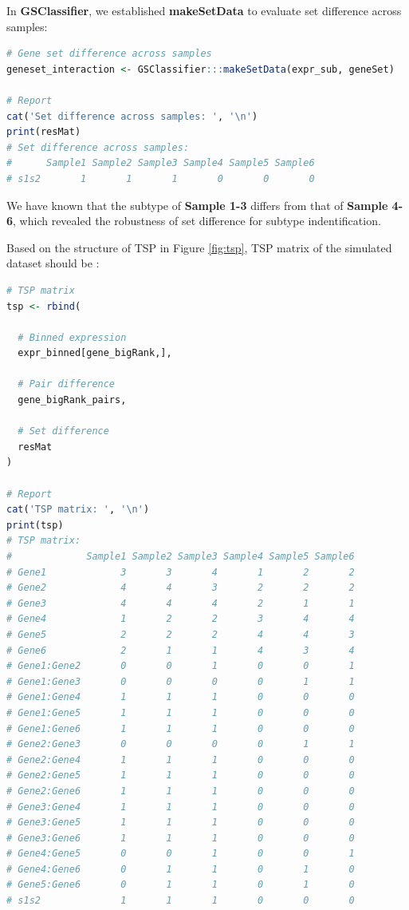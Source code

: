 \documentclass[
  12pt,
]{book}
\begin{document}
In \textbf{GSClassifier}, we established \textbf{makeSetData} to evaluate set difference across samples:

\begin{lstlisting}[language=R]
# Gene set difference across samples
geneset_interaction <- GSClassifier:::makeSetData(expr_sub, geneSet)

# Report 
cat('Set difference across samples: ', '\n')
print(resMat)
# Set difference across samples:  
#      Sample1 Sample2 Sample3 Sample4 Sample5 Sample6
# s1s2       1       1       1       0       0       0
\end{lstlisting}

We have known that the subtype of \textbf{Sample 1-3} differs from that of \textbf{Sample 4-6}, which revealed the robustness of set difference for subtype indentification.

Based on the structure of TSP in Figure \ref{fig:tsp}, TSP matrix of the simulated dataset should be :

\begin{lstlisting}[language=R]
# TSP matrix
tsp <- rbind(
  
  # Binned expression
  expr_binned[gene_bigRank,],
  
  # Pair difference
  gene_bigRank_pairs,
  
  # Set difference
  resMat
)

# Report 
cat('TSP matrix: ', '\n')
print(tsp)
# TSP matrix:  
#             Sample1 Sample2 Sample3 Sample4 Sample5 Sample6
# Gene1             3       3       4       1       2       2
# Gene2             4       4       3       2       2       2
# Gene3             4       4       4       2       1       1
# Gene4             1       2       2       3       4       4
# Gene5             2       2       2       4       4       3
# Gene6             2       1       1       4       3       4
# Gene1:Gene2       0       0       1       0       0       1
# Gene1:Gene3       0       0       0       0       1       1
# Gene1:Gene4       1       1       1       0       0       0
# Gene1:Gene5       1       1       1       0       0       0
# Gene1:Gene6       1       1       1       0       0       0
# Gene2:Gene3       0       0       0       0       1       1
# Gene2:Gene4       1       1       1       0       0       0
# Gene2:Gene5       1       1       1       0       0       0
# Gene2:Gene6       1       1       1       0       0       0
# Gene3:Gene4       1       1       1       0       0       0
# Gene3:Gene5       1       1       1       0       0       0
# Gene3:Gene6       1       1       1       0       0       0
# Gene4:Gene5       0       0       1       0       0       1
# Gene4:Gene6       0       1       1       0       1       0
# Gene5:Gene6       0       1       1       0       1       0
# s1s2              1       1       1       0       0       0
\end{lstlisting}
\end{document}
